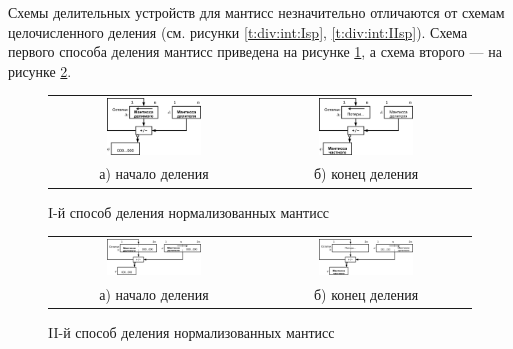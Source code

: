 Схемы делительных устройств для мантисс незначительно отличаются от схемам целочисленного деления (см. рисунки \ref{t:div:int:Isp}, \ref{t:div:int:IIsp}). Схема первого способа деления мантисс приведена на рисунке \ref{t:div:fpt:Isp}, а схема второго --- на рисунке \ref{t:div:fpt:IIsp}.

\begin{figure}[!ht]
    \centering
    \begin{tabular}{c||c}
        \includegraphics[width=0.47\textwidth]{fig/IFDivBegin}
            & \includegraphics[width=0.47\textwidth]{fig/IFDivEnd} \\
        а) начало деления
            & б) конец деления
    \end{tabular}
    \caption{I-й способ деления нормализованных мантисс} \label{t:div:fpt:Isp}
\end{figure}

\begin{figure}[!ht]
    \centering
    \begin{tabular}{c||c}
        \includegraphics[width=0.47\textwidth]{fig/IIFDivBegin}
            & \includegraphics[width=0.47\textwidth]{fig/IIFDivEnd} \\
        а) начало деления
            & б) конец деления
    \end{tabular}
    \caption{II-й способ деления нормализованных мантисс} \label{t:div:fpt:IIsp}
\end{figure}


